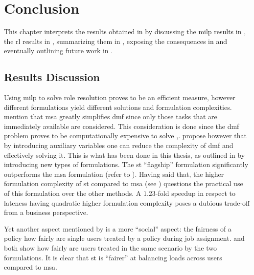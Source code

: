 \chapter{Conclusion}
\label{ch:conclusion}

This chapter interprets the results obtained in  by discussing the \gls{milp} results in , the \gls{rl} results in , summarizing them in , exposing the consequences in  and eventually outlining future work in .

\section{ Results Discussion}
\label{sec:optimization_discussion}

Using \gls{milp} to solve role resolution proves to be an efficient measure, however different formulations yield different solutions and formulation complexities. \citet[p. 15]{Zeng2005} mention that \gls{msa} greatly simplifies \gls{dmf} since only those tasks that are immediately available are considered. This consideration is done since the \gls{dmf} problem proves to be computationally expensive to solve \citep[p. 13]{Zeng2005},\citep{Garey1990}. \citet[p. 13]{Zeng2005} propose however that by introducing auxiliary variables one can reduce the complexity of \gls{dmf} and effectively solving it. This is what has been done in this thesis, as outlined in  by introducing new types of formulations. The \gls{st} ``flagship'' formulation significantly outperforms the \gls{msa} formulation (refer to ). Having said that, the higher formulation complexity of \gls{st} compared to \gls{msa} (see ) questions the practical use of this formulation over the other methods. A $1.23$-fold speedup in respect to lateness having quadratic higher formulation complexity poses a dubious trade-off from a business perspective.


Yet another aspect mentioned by \citet[pp. 17--18]{Zeng2005} is a more ``social'' aspect: the fairness of a policy \ie how fairly are single users treated by a policy during job assignment.  and  both show how fairly are users treated in the same scenario by the two formulations. It is clear that \gls{st} is ``fairer'' at balancing loads across users compared to \gls{msa}.

